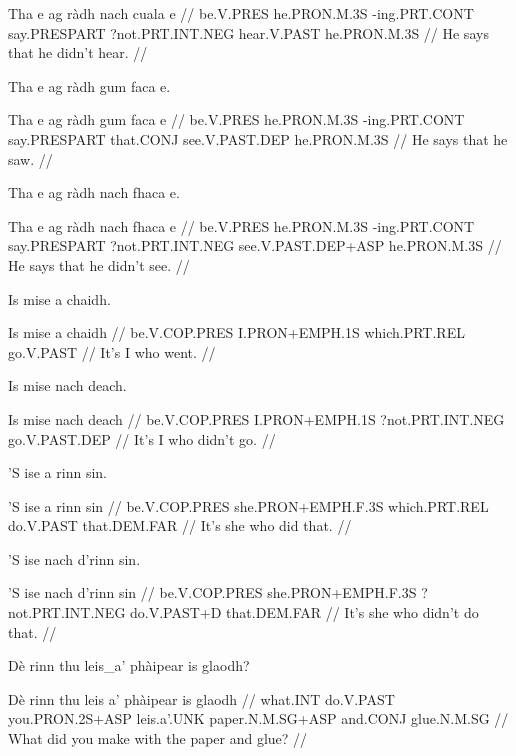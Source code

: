 \documentclass[a4paper,10pt]{article}
\begin{document}
\vspace{4mm}
\gla Tha e ag ràdh nach cuala e  //
\glb be.V.PRES he.PRON.M.3S -ing.PRT.CONT say.PRESPART ?not.PRT.INT.NEG hear.V.PAST he.PRON.M.3S  //
\glft He says that he didn't hear. //
\endgl
\xe

\ex
\begingl
\glpre Tha e ag ràdh gum faca e. 

\vspace{4mm}
\gla Tha e ag ràdh gum faca e  //
\glb be.V.PRES he.PRON.M.3S -ing.PRT.CONT say.PRESPART that.CONJ see.V.PAST.DEP he.PRON.M.3S  //
\glft He says that he saw. //
\endgl
\xe

\ex
\begingl
\glpre Tha e ag ràdh nach fhaca e. 

\vspace{4mm}
\gla Tha e ag ràdh nach fhaca e  //
\glb be.V.PRES he.PRON.M.3S -ing.PRT.CONT say.PRESPART ?not.PRT.INT.NEG see.V.PAST.DEP+ASP he.PRON.M.3S  //
\glft He says that he didn't see. //
\endgl
\xe

\ex
\begingl
\glpre Is mise a chaidh. 

\vspace{4mm}
\gla Is mise a chaidh  //
\glb be.V.COP.PRES I.PRON+EMPH.1S which.PRT.REL go.V.PAST  //
\glft It's I who went. //
\endgl
\xe

\ex
\begingl
\glpre Is mise nach deach. 

\vspace{4mm}
\gla Is mise nach deach  //
\glb be.V.COP.PRES I.PRON+EMPH.1S ?not.PRT.INT.NEG go.V.PAST.DEP  //
\glft It's I who didn't go. //
\endgl
\xe

\ex
\begingl
\glpre 'S ise a rinn sin. 

\vspace{4mm}
\gla 'S ise a rinn sin  //
\glb be.V.COP.PRES she.PRON+EMPH.F.3S which.PRT.REL do.V.PAST that.DEM.FAR  //
\glft It's she who did that. //
\endgl
\xe

\ex
\begingl
\glpre 'S ise nach d'rinn sin. 

\vspace{4mm}
\gla 'S ise nach d'rinn sin  //
\glb be.V.COP.PRES she.PRON+EMPH.F.3S ?not.PRT.INT.NEG do.V.PAST+D that.DEM.FAR  //
\glft It's she who didn't do that. //
\endgl
\xe

\ex
\begingl
\glpre Dè rinn thu leis\_a' phàipear is glaodh? 

\vspace{4mm}
\gla Dè rinn thu {leis a'} phàipear is glaodh  //
\glb what.INT do.V.PAST you.PRON.2S+ASP leis.a'.UNK paper.N.M.SG+ASP and.CONJ glue.N.M.SG  //
\glft What did you make with the paper and glue? //
\endgl
\xe
\end{document}
